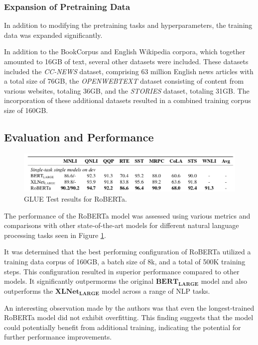 \documentclass[a4paper,10pt]{report}
\begin{document}
\subsubsection{Expansion of Pretraining Data}
In addition to modifying the pretraining tasks and hyperparameters, the training data was expanded significantly.

In addition to the BookCorpus and English Wikipedia corpora, which together amounted to 16GB of text, several other datasets were included. These datasets included the \textit{CC-NEWS} dataset, comprising 63 million English news articles with a total size of 76GB, the \textit{OPENWEBTEXT} dataset consisting of content from various websites, totaling 36GB, and the \textit{STORIES} dataset, totaling 31GB. The incorporation of these additional datasets resulted in a combined training corpus size of 160GB. \cite{roberta}

\subsection{Evaluation and Performance}
\begin{figure}
  \centering
  \includegraphics[width=12cm]{img/roberta_results.png}
  \caption{GLUE Test results for RoBERTa. \cite{roberta}}
  \label{fig:roberta_results}
\end{figure}
The performance of the RoBERTa model was assessed using various metrics and comparisons with other state-of-the-art models for different natural language processing tasks seen in Figure \ref{fig:roberta_results}.

It was determined that the best performing configuration of RoBERTa utilized a training data corpus of 160GB, a batch size of 8k, and a total of 500K training steps. This configuration resulted in superior performance compared to other models. It significantly outpermorms the original $\mathbf{BERT_{LARGE}}$ model and also outperforms the $\mathbf{XLNet_{LARGE}}$ model across a range of NLP tasks.

An interesting observation made by the authors was that even the longest-trained RoBERTa model did not exhibit overfitting. This finding suggests that the model could potentially benefit from additional training, indicating the potential for further performance improvements.
\end{document}
